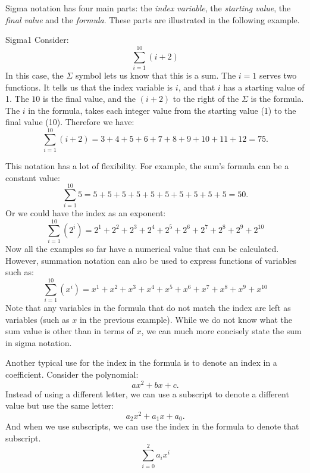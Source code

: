  Sigma notation has four main parts:  the \emph{index variable}, the \emph{starting value}, the \emph{final value} and the \emph{formula}.
These parts are illustrated in the following example.

\begin{example}{Sigma1}
Consider:
\[\sum _{i=1}^{10}(i+2)\]
In this case, the $\Sigma$ symbol lets us know that this is a sum.  The $i=1$ serves two functions.  It tells us that the index variable is $i$, and that $i$ has a starting value of 1. The $10$ is the final value, and the $(i+2)$ to the right of the $\Sigma$ is the formula. The $i$ in the formula, takes each integer value from the starting value (1) to the final value (10).  
Therefore we have:
\[\sum _{i=1}^{10}(i+2) = 3 + 4 + 5 + 6 + 7 + 8 + 9 + 10 + 11 + 12=75.\]
\end {example}

This notation has a lot of flexibility. For example, the sum's formula can be a constant value:
\[\sum _{i=1}^{10}5 = 5 + 5 + 5 + 5 + 5 + 5 + 5 + 5 + 5 + 5 = 50.\]
Or we could have the index as an exponent:
\[\sum _{i=1}^{10}(2^i) = 2^1 + 2^2 + 2^3 + 2^4 + 2^5 + 2^6+ 2^7+ 2^8+ 2^9+ 2^{10} \]
Now all the examples so far have a numerical value that can be calculated.  However, summation notation can also be used to express functions of variables such as:  
\[\sum _{i=1}^{10}(x^i)= x^1 + x^2 + x^3 + x^4 + x^5 + x^6+ x^7+ x^8+ x^9+ x^{10} \]
Note that any variables in the formula that do not match the index are left as variables (such as $x$ in the previous example).  
While we do not know what the sum value is other than in terms of $x$, we can much more concisely state the sum in sigma notation.

Another typical use for the index in the formula is to denote an index in a coefficient.  Consider the polynomial:
\[ax^2 + bx + c.\]
Instead of using a different letter, we can use a subscript to denote a different value but use the same letter:
\[a_2x^2 + a_1x + a_0.\]
And when we use subscripts, we can use the index in the formula to denote that subscript.
\[\sum_{i=0}^{2}a_ix^i\]


